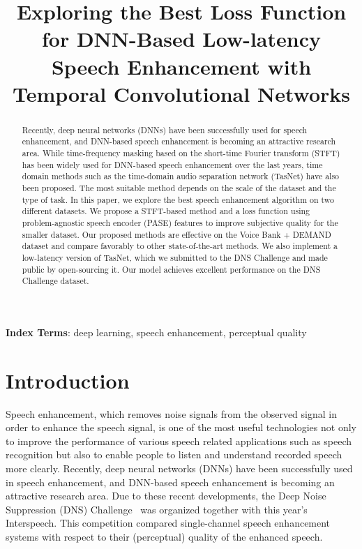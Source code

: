 \documentclass[a4paper]{article}
\title{Exploring the Best Loss Function for DNN-Based Low-latency Speech Enhancement with Temporal Convolutional Networks}
\begin{document}
\setlength{\abovedisplayskip}{5pt} 
\setlength{\belowdisplayskip}{5pt} 


\maketitle
\begin{spacing}{0.9}
\begin{abstract}
Recently, deep neural networks (DNNs) have been successfully used for speech enhancement, and DNN-based speech enhancement is becoming an attractive research area.
While time-frequency masking based on the short-time Fourier transform (STFT) has been widely used for DNN-based speech enhancement over the last years, time domain methods such as the time-domain audio separation network (TasNet) have also been proposed.
The most suitable method depends on the scale of the dataset and the type of task.  
In this paper, we explore the best speech enhancement algorithm on two different datasets.
We propose a STFT-based method and a loss function using problem-agnostic speech encoder (PASE) features to improve subjective quality for the smaller dataset.
Our proposed methods are effective on the Voice Bank + DEMAND dataset and compare favorably to other state-of-the-art methods. 
We also implement a low-latency version of TasNet, which we submitted to the DNS Challenge and made public by open-sourcing it.
Our model achieves excellent performance on the DNS Challenge dataset.   
\end{abstract}
\noindent\textbf{Index Terms}: deep learning, speech enhancement, perceptual quality

\section{Introduction}
Speech enhancement, which removes noise signals from the observed signal in order to enhance the speech signal, is one of the most useful technologies not only  to improve the performance of various speech related applications such as speech recognition but also to enable people to listen and understand recorded speech more clearly. Recently, deep neural networks (DNNs) have been successfully used in speech enhancement, and DNN-based speech enhancement is becoming an attractive research area.
Due to these recent developments, the Deep Noise Suppression (DNS) Challenge~\cite{reddy2020interspeech} was organized together with this year's Interspeech. 
This competition compared single-channel  speech enhancement systems with respect to their (perceptual) quality of the enhanced speech.


\end{spacing}
\end{document}
